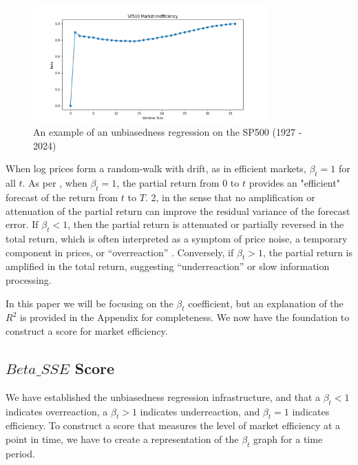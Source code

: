\begin{figure}[h!]
    \centering
    \includegraphics[width=0.8\textwidth]{../figs/SP500 Market Inefficiency.png}
    \caption{An example of an unbiasedness regression on the SP500 (1927 - 2024)}
    \label{fig:sp_500_unbiasedness}
\end{figure}

When log prices form a random-walk with drift, as in efficient markets, $\beta_t = 1$ for all $t$. 
As per \citet{mincer_zarnowitz_1969}, when $\beta_t = 1$, the partial return from $0$ to $t$ provides an "efficient" forecast of the return
from $t$ to $T$. 2, in the sense that no amplification or attenuation of the partial return can improve the residual variance
of the forecast error. If $\beta_t < 1$, then the partial return is attenuated or partially reversed in the total return, which is often interpreted as a symptom of price noise,
a temporary component in prices, or “overreaction” \citep{barclay_hendershott_2003}. Conversely, if $\beta_t > 1$, the partial return is amplified in the total return, suggesting “underreaction” or slow information processing.

In this paper we will be focusing on the $\beta_t$ coefficient, but an explanation of the $R^2$ is provided in the Appendix for completeness. 
We now have the foundation to construct a score for market efficiency.

\subsection{$Beta\_SSE$ Score}

We have established the unbiasedness regression infrastructure, and that a $\beta_t < 1$ indicates overreaction, a $\beta_t > 1$ indicates underreaction, and $\beta_t = 1$ indicates efficiency.
To construct a score that measures the level of market efficiency at a point in time, we have to create a representation of the $\beta_t$ graph for a time period.


